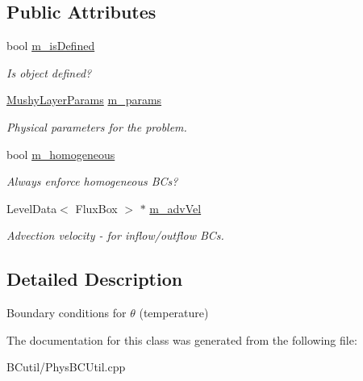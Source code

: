 \subsection*{Public Attributes}
\begin{DoxyCompactItemize}
\item 
\hypertarget{class_basictheta_b_c_function_a842d987239a484d371e6fc839fe8feff}{bool \hyperlink{class_basictheta_b_c_function_a842d987239a484d371e6fc839fe8feff}{m\-\_\-is\-Defined}}\label{class_basictheta_b_c_function_a842d987239a484d371e6fc839fe8feff}

\begin{DoxyCompactList}\small\item\em Is object defined? \end{DoxyCompactList}\item 
\hypertarget{class_basictheta_b_c_function_ae0f8abbdd406a490a557534fc38f869e}{\hyperlink{class_mushy_layer_params}{Mushy\-Layer\-Params} \hyperlink{class_basictheta_b_c_function_ae0f8abbdd406a490a557534fc38f869e}{m\-\_\-params}}\label{class_basictheta_b_c_function_ae0f8abbdd406a490a557534fc38f869e}

\begin{DoxyCompactList}\small\item\em Physical parameters for the problem. \end{DoxyCompactList}\item 
\hypertarget{class_basictheta_b_c_function_adc28bfe77c9d2302c44b4568486fdd94}{bool \hyperlink{class_basictheta_b_c_function_adc28bfe77c9d2302c44b4568486fdd94}{m\-\_\-homogeneous}}\label{class_basictheta_b_c_function_adc28bfe77c9d2302c44b4568486fdd94}

\begin{DoxyCompactList}\small\item\em Always enforce homogeneous B\-Cs? \end{DoxyCompactList}\item 
\hypertarget{class_basictheta_b_c_function_ad7631561a300491eb32008c3b276d4dc}{Level\-Data$<$ Flux\-Box $>$ $\ast$ \hyperlink{class_basictheta_b_c_function_ad7631561a300491eb32008c3b276d4dc}{m\-\_\-adv\-Vel}}\label{class_basictheta_b_c_function_ad7631561a300491eb32008c3b276d4dc}

\begin{DoxyCompactList}\small\item\em Advection velocity -\/ for inflow/outflow B\-Cs. \end{DoxyCompactList}\end{DoxyCompactItemize}


\subsection{Detailed Description}
Boundary conditions for $\theta$ (temperature) 

The documentation for this class was generated from the following file\-:\begin{DoxyCompactItemize}
\item 
B\-Cutil/Phys\-B\-C\-Util.\-cpp\end{DoxyCompactItemize}
